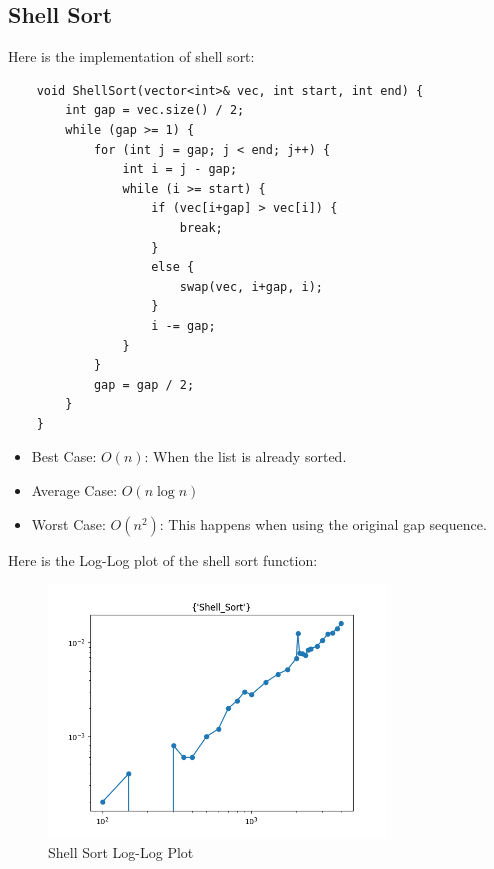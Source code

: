 \documentclass{article}
\begin{document}
\vspace{\baselineskip}
\subsection{Shell Sort}
Here is the implementation of shell sort:
\begin{verbatim}
    void ShellSort(vector<int>& vec, int start, int end) {
        int gap = vec.size() / 2;
        while (gap >= 1) {
            for (int j = gap; j < end; j++) {
                int i = j - gap;
                while (i >= start) {
                    if (vec[i+gap] > vec[i]) {
                        break;
                    }
                    else {
                        swap(vec, i+gap, i);
                    }
                    i -= gap;
                }
            }
            gap = gap / 2;
        }
    }
\end{verbatim}

\begin{itemize}
    \item Best Case: $O(n)$: When the list is already sorted.
    \item Average Case: $O(n \log n)$
    \item Worst Case: $O(n^2)$: This happens when using the original gap sequence.
\end{itemize}

Here is the Log-Log plot of the shell sort function:
\begin{figure}[H]
    \centering
    \includegraphics*[width=0.8\textwidth]{img/loglog_Shell_Sort.png}
    \caption{Shell Sort Log-Log Plot}
\end{figure}
\end{document}
